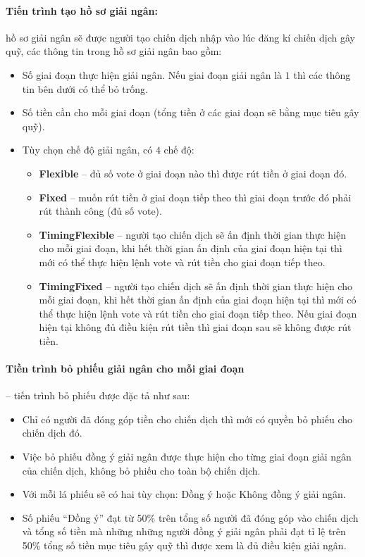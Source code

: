 \documentclass[../main-report.tex]{subfiles}
\begin{document}
\paragraph{Tiến trình tạo hồ sơ giải ngân:} hồ sơ giải ngân sẽ được người tạo chiến dịch nhập vào lúc đăng kí chiến dịch gây quỹ, các thông tin trong hồ sơ giải ngân bao gồm:

\begin{itemize}
\item Số giai đoạn thực hiện giải ngân. Nếu giai đoạn giải ngân là $ 1 $ thì các thông tin bên dưới có thể bỏ trống.
\item Số tiền cần cho mỗi giai đoạn (tổng tiền ở các giai đoạn sẽ bằng mục tiêu gây quỹ).
\item Tùy chọn chế độ giải ngân, có $ 4 $ chế độ:
\begin{itemize}
\item \textbf{Flexible} -- đủ số vote ở giai đoạn nào thì được rút tiền ở giai đoạn đó.
\item \textbf{Fixed} -- muốn rút tiền ở giai đoạn tiếp theo thì giai đoạn trước đó phải rút thành công (đủ số vote).
\item \textbf{TimingFlexible} -- người tạo chiến dịch sẽ ấn định thời gian thực hiện cho mỗi giai đoạn, khi hết thời gian ấn định của giai đoạn hiện tại thì mới có thể thực hiện lệnh vote và rút tiền cho giai đoạn tiếp theo. 
\item \textbf{TimingFixed} -- người tạo chiến dịch sẽ ấn định thời gian thực hiện cho mỗi giai đoạn, khi hết thời gian ấn định của giai đoạn hiện tại thì mới có thể thực hiện lệnh vote và rút tiền cho giai đoạn tiếp theo. Nếu giai đoạn hiện tại không đủ điều kiện rút tiền thì giai đoạn sau sẽ không được rút tiền.
\end{itemize}
\end{itemize}

\paragraph{Tiền trình bỏ phiếu giải ngân cho mỗi giai đoạn} -- tiến trình bỏ phiếu được đặc tả như sau:

\begin{itemize}
\item Chỉ có người đã đóng góp tiền cho chiến dịch thì mới có quyền bỏ phiếu cho chiến dịch đó.
\item Việc bỏ phiếu đồng ý giải ngân được thực hiện cho từng giai đoạn giải ngân của chiến dịch, không bỏ phiếu cho toàn bộ chiến dịch.
\item Với mỗi lá phiếu sẽ có hai tùy chọn: Đồng ý hoặc Không đồng ý giải ngân.
\item Số phiếu ``Đồng ý'' đạt từ 50\% trên tổng số người đã đóng góp vào chiến dịch và tổng số tiền mà những những người đồng ý giải ngân phải đạt tỉ lệ trên 50\% tổng số tiền mục tiêu gây quỹ thì được xem là đủ điều kiện giải ngân.
\end{itemize}
\end{document}
